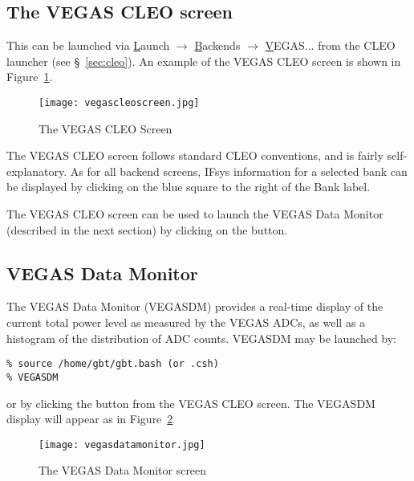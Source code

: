 \newpage

\subsection{The VEGAS CLEO screen}\label{sec:vegas_cleo}


This can be launched via {\btt \underline{L}aunch} $\rightarrow$
{\btt \underline{B}ackends} $\rightarrow$ {\btt \underline{V}EGAS...} from the
\gls{CLEO} launcher (see \S~\ref{sec:cleo}). An example of the \gls{VEGAS}
\gls{CLEO} screen is shown in Figure~\ref{fig:vegas_cleo}.

\begin{figure}[!h]
\begin{center}
\texttt{[image: vegascleoscreen.jpg]}
\caption[]{The VEGAS CLEO Screen \label{fig:vegas_cleo}}
\end{center}
\end{figure}

The \gls{VEGAS} \gls{CLEO} screen follows standard \gls{CLEO} conventions, and is fairly
self-explanatory. As for all backend screens, \gls{IFsys} information for a selected
bank can be displayed by clicking on the blue square to the right of the Bank label.

The \gls{VEGAS} \gls{CLEO} screen can be used to launch the \gls{VEGAS} Data Monitor (described
in the next section) by clicking on the  button.

\newpage

\subsection{VEGAS Data Monitor}\label{sec:vegasdm}
The \gls{VEGAS} Data Monitor (VEGASDM) provides a real-time display of the current
total power level as measured by the \gls{VEGAS} \glspl{ADC}, as well as a histogram of
the distribution of \gls{ADC} counts.  VEGASDM may be launched by:

\begin{verbatim}
% source /home/gbt/gbt.bash (or .csh)
% VEGASDM
\end{verbatim}

or by clicking the  button from the \gls{VEGAS} \gls{CLEO} screen.
The VEGASDM display will appear as in Figure~\ref{fig:vegasdm}

\begin{figure}[!h]
\begin{center}
\texttt{[image: vegasdatamonitor.jpg]}
\caption[]{The VEGAS Data Monitor screen}
\label{fig:vegasdm} 
\end{center}
\end{figure}

